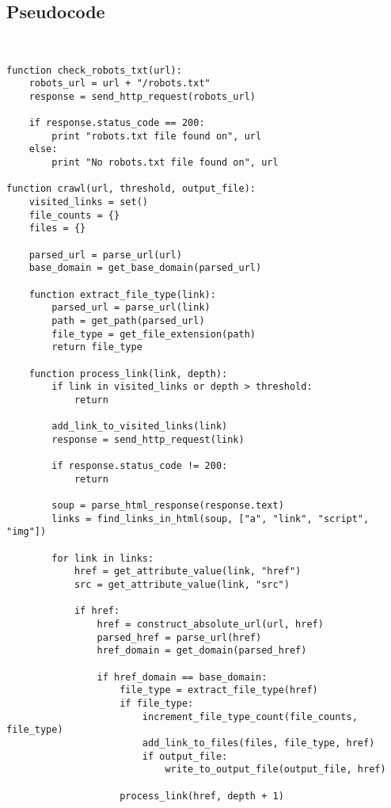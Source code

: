 \documentclass{article}
\begin{document}
\subsection{Pseudocode}
\label{sec:code}
\begin{verbatim}
    

function check_robots_txt(url):
    robots_url = url + "/robots.txt"
    response = send_http_request(robots_url)
    
    if response.status_code == 200:
        print "robots.txt file found on", url
    else:
        print "No robots.txt file found on", url

function crawl(url, threshold, output_file):
    visited_links = set()
    file_counts = {}
    files = {}
    
    parsed_url = parse_url(url)
    base_domain = get_base_domain(parsed_url)
    
    function extract_file_type(link):
        parsed_url = parse_url(link)
        path = get_path(parsed_url)
        file_type = get_file_extension(path)
        return file_type
    
    function process_link(link, depth):
        if link in visited_links or depth > threshold:
            return
        
        add_link_to_visited_links(link)
        response = send_http_request(link)
        
        if response.status_code != 200:
            return
        
        soup = parse_html_response(response.text)
        links = find_links_in_html(soup, ["a", "link", "script", "img"])
        
        for link in links:
            href = get_attribute_value(link, "href")
            src = get_attribute_value(link, "src")
            
            if href:
                href = construct_absolute_url(url, href)
                parsed_href = parse_url(href)
                href_domain = get_domain(parsed_href)
                
                if href_domain == base_domain:
                    file_type = extract_file_type(href)
                    if file_type:
                        increment_file_type_count(file_counts, file_type)
                        add_link_to_files(files, file_type, href)
                        if output_file:
                            write_to_output_file(output_file, href)
                    
                    process_link(href, depth + 1)
            

\end{verbatim}
\end{document}
